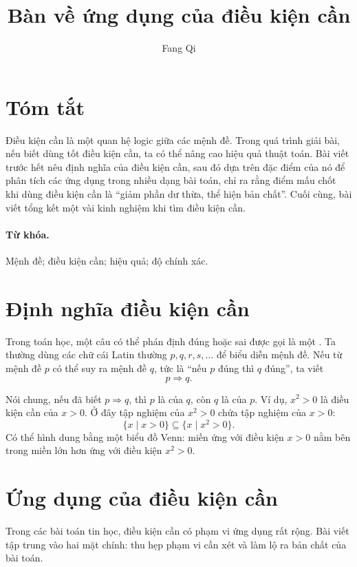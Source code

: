 \documentclass[11pt]{article}
\title{Bàn về ứng dụng của điều kiện cần}
\author{Fang Qi}
\date{}
\begin{document}
\maketitle


\section*{Tóm tắt}

Điều kiện cần là một quan hệ logic giữa các mệnh đề. Trong quá trình giải
bài, nếu biết dùng tốt điều kiện cần, ta có thể nâng cao hiệu quả thuật toán.
Bài viết trước hết nêu định nghĩa của điều kiện cần, sau đó dựa trên đặc điểm
của nó để phân tích các ứng dụng trong nhiều dạng bài toán, chỉ ra rằng điểm
mấu chốt khi dùng điều kiện cần là ``giảm phần dư thừa, thể hiện bản chất''.
Cuối cùng, bài viết tổng kết một vài kinh nghiệm khi tìm điều kiện cần.

\paragraph{Từ khóa.}
Mệnh đề; điều kiện cần; hiệu quả; độ chính xác.

\section{Định nghĩa điều kiện cần}

Trong toán học, một câu có thể phán định đúng hoặc sai được gọi là một
. Ta thường dùng các chữ cái Latin thường $p,q,r,s,\ldots$ để
biểu diễn mệnh đề. Nếu từ mệnh đề $p$ có thể suy ra mệnh đề $q$, tức là
``nếu $p$ đúng thì $q$ đúng'', ta viết
\[
  p\Rightarrow q.
\]

Nói chung, nếu đã biết $p\Rightarrow q$, thì $p$ là  của
$q$, còn $q$ là  của $p$. Ví dụ, $x^2>0$ là điều kiện cần
của $x>0$. Ở đây tập nghiệm của $x^2>0$ chứa tập nghiệm của $x>0$:
\[
  \{x\mid x>0\}\subseteq \{x\mid x^2>0\}.
\]
Có thể hình dung bằng một biểu đồ Venn: miền ứng với điều kiện $x>0$ nằm bên
trong miền lớn hơn ứng với điều kiện $x^2>0$.

\section{Ứng dụng của điều kiện cần}

Trong các bài toán tin học, điều kiện cần có phạm vi ứng dụng rất rộng. Bài
viết tập trung vào hai mặt chính: thu hẹp phạm vi cần xét và làm lộ ra bản
chất của bài toán.
\end{document}
